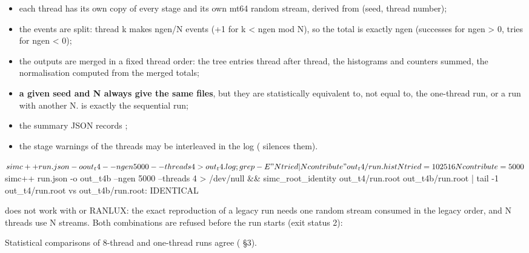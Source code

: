 \begin{itemize}
\item each thread has its own copy of every stage and its own mt64 random stream, derived from (seed, thread number);
\item the events are split: thread k makes ngen/N events (+1 for k < ngen mod N), so the total is exactly ngen (successes
for ngen > 0, tries for ngen < 0);
\item the outputs are merged in a fixed thread order: the tree entries thread after thread, the histograms and counters
summed, the normalisation computed from the merged totals;
\item \textbf{a given seed and N always give the same files}, but they are statistically equivalent to, not equal to, the
one-thread run, or a run with another N.  is exactly the sequential run;
\item the summary JSON records ;
\item the stage warnings of the threads may be interleaved in the log ( silences them).
\end{itemize}
\begin{simcshell}[basicstyle=\ttfamily\tiny]
$ simc++ run.json -o out_t4 --ngen 5000 --threads 4 > out_t4.log; grep -E "Ntried|Ncontribute" out_t4/run.hist
            Ntried         =     102516
            Ncontribute    =       5000
$ simc++ run.json -o out_t4b --ngen 5000 --threads 4 > /dev/null && simc_root_identity out_t4/run.root out_t4b/run.root | tail -1
out_t4/run.root vs out_t4b/run.root: IDENTICAL
\end{simcshell}
\begin{simcwarning}
 does not work with  or RANLUX: the exact reproduction of a legacy
run needs one random stream consumed in the legacy order, and N threads use N streams. Both combinations are refused
before the run starts (exit status 2):
\end{simcwarning}
Statistical comparisons of 8-thread and one-thread runs agree ( §3).

